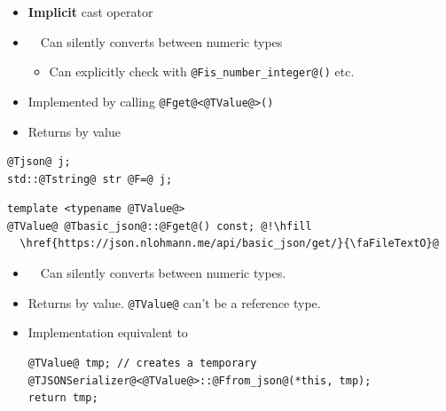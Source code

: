 \documentclass{slides}
\makeatletter
\newcommand{\@slidetitle}{}
\newcommand{\slidetitle}[1]{\renewcommand{\@slidetitle}{#1}}
\makeatother
\begin{document}
\begin{itemize}[itemsep=0.7em]
  \item {\bfseries Implicit} cast operator
  \item {\color{red}\faWarning}\ \ Can silently converts between numeric types
    \begin{itemize}
      \item Can explicitly check with \lstinline{@Fis_number_integer@()} etc. \hfill
        \href{https://json.nlohmann.me/features/types/number_handling/#determine-number-types}{\faFileTextO}
    \end{itemize}
  \item Implemented by calling \lstinline{@Fget@<@TValue@>()}
  \item Returns by value
\end{itemize}

\begin{tcolorbox}
\begin{lstlisting}
@Tjson@ j;
std::@Tstring@ str @F=@ j;
\end{lstlisting}
\end{tcolorbox}

\pagebreak
\slidetitle{Value access}

\begin{tcolorbox}
\begin{lstlisting}
template <typename @TValue@>
@TValue@ @Tbasic_json@::@Fget@() const; @!\hfill
  \href{https://json.nlohmann.me/api/basic_json/get/}{\faFileTextO}@
\end{lstlisting}
\end{tcolorbox}
\vspace{0em}

\begin{itemize}[itemsep=0.7em]
  \item {\color{red}\faWarning}\ \ Can silently converts between numeric types.
  \item Returns by value. \lstinline{@TValue@} can't be a reference type.
  \item Implementation equivalent to \vspace{-0.5em}
\begin{tcolorbox}
\begin{lstlisting}
@TValue@ tmp; // creates a temporary
@TJSONSerializer@<@TValue@>::@Ffrom_json@(*this, tmp);
return tmp;
\end{lstlisting}
\end{tcolorbox}
\end{itemize}
\end{document}
